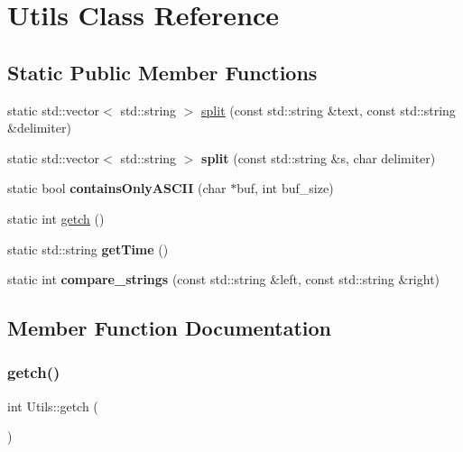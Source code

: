 \hypertarget{class_utils}{}\section{Utils Class Reference}
\label{class_utils}
\subsection*{Static Public Member Functions}
\begin{DoxyCompactItemize}
\item 
static std\+::vector$<$ std\+::string $>$ \hyperlink{class_utils_a04abf2d4f3728fc99c889075e767fd55}{split} (const std\+::string \&text, const std\+::string \&delimiter)
\item 
\mbox{\label{class_utils_a45852663e3048a8b9e36599c8bdd0c5a}} 
static std\+::vector$<$ std\+::string $>$ {\bfseries split} (const std\+::string \&s, char delimiter)
\item 
\mbox{\label{class_utils_ac80d067f547572a4b66af40fec030133}} 
static bool {\bfseries contains\+Only\+A\+S\+C\+II} (char $\ast$buf, int buf\+\_\+size)
\item 
static int \hyperlink{class_utils_a9b63fa15f701bf63d80abf7ede3637c1}{getch} ()
\item 
\mbox{\label{class_utils_a38f2e956a2744708e3b33dda785216c1}} 
static std\+::string {\bfseries get\+Time} ()
\item 
\mbox{\label{class_utils_acf5f214fa8a0fbd8a17a208ddb333725}} 
static int {\bfseries compare\+\_\+strings} (const std\+::string \&left, const std\+::string \&right)
\end{DoxyCompactItemize}


\subsection{Member Function Documentation}
\mbox{\label{class_utils_a9b63fa15f701bf63d80abf7ede3637c1}} 
\subsubsection{\texorpdfstring{getch()}{getch()}}
{\footnotesize\ttfamily int Utils\+::getch (\begin{DoxyParamCaption}{ }\end{DoxyParamCaption})\hspace{0.3cm}{\ttfamily [static]}}

